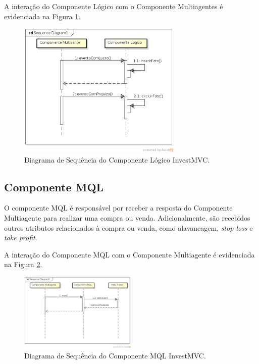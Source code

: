 A interação do Componente Lógico com o Componente Multiagentes é evidenciada na Figura \ref{sequenciaLogico}.

\begin{figure}[H]
\centering
\includegraphics[width=0.7\textwidth]{figuras/sequenciaLogico}
\caption{Diagrama de Sequência do Componente Lógico InvestMVC.}
\label{sequenciaLogico}
\end{figure}

\subsection{Componente MQL}

O componente MQL é responsável por receber a resposta do Componente Multiagente para realizar uma compra ou venda. Adicionalmente, são recebidos outros atributos relacionados à compra ou venda, como alavancagem, \textit{stop loss} e \textit{take profit}.

A interação do Componente MQL com o Componente Multiagente é evidenciada na Figura \ref{sequenciaMQL}.

\begin{figure}[H]
\centering
\includegraphics[width=0.5\textwidth]{figuras/sequenciaMQL}
\caption{Diagrama de Sequência do Componente MQL InvestMVC.}
\label{sequenciaMQL}
\end{figure}


